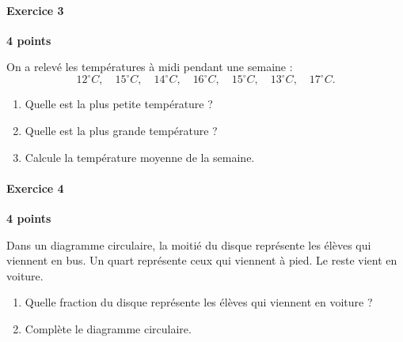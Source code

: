\documentclass[a4paper,10pt]{report}
\begin{document}
\medskip
\paragraph{Exercice 3} \hfill \textbf{4 points}

\noindent On a relevé les températures à midi pendant une semaine :
\[
12^\circ C,\quad 15^\circ C,\quad 14^\circ C,\quad 16^\circ C,\quad 15^\circ C,\quad 13^\circ C,\quad 17^\circ C.
\]
\begin{enumerate}
\item Quelle est la plus petite température ?
\item Quelle est la plus grande température ?
\item Calcule la température moyenne de la semaine.
\end{enumerate}

\medskip\noindent\grandscarreaux{\linewidth}{3cm}

\medskip
\paragraph{Exercice 4} \hfill \textbf{4 points}

\noindent Dans un diagramme circulaire, la moitié du disque représente les élèves qui viennent en bus. Un quart représente ceux qui viennent à pied. Le reste vient en voiture.
\begin{enumerate}
\item Quelle fraction du disque représente les élèves qui viennent en voiture ?
\item Complète le diagramme circulaire.
\end{enumerate}

\begin{center}
\end{center}
\end{document}
